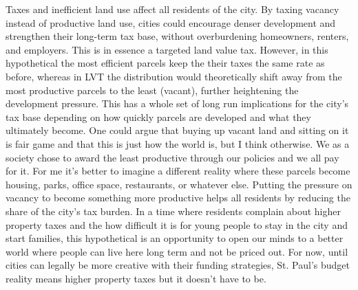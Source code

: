 \documentclass[12pt]{article}
\begin{document}
Taxes and inefficient land use affect all residents of the city. By taxing vacancy instead of productive land use, cities could encourage denser development and strengthen their long-term tax base, without overburdening homeowners, renters, and employers. This is in essence a targeted land value tax. However, in this hypothetical the most efficient parcels keep the their taxes the same rate as before, whereas in LVT the distribution would theoretically shift away from the most productive parcels to the least (vacant), further heightening the development pressure. This has a whole set of long run implications for the city's tax base depending on how quickly parcels are developed and what they ultimately become. One could argue that buying up vacant land and sitting on it is fair game and that this is just how the world is, but I think otherwise. We as a society chose to award the least productive through our policies and we all pay for it. For me it's better to imagine a different reality where these parcels become housing, parks, office space, restaurants, or whatever else. Putting the pressure on vacancy to become something more productive helps all residents by reducing the share of the city's tax burden. In a time where residents complain about higher property taxes and the how difficult it is for young people to stay in the city and start families, this hypothetical is an opportunity to open our minds to a better world where people can live here long term and not be priced out. For now, until cities can legally be more creative with their funding strategies, St. Paul’s budget reality means higher property taxes but it doesn't have to be. 
\end{document}

